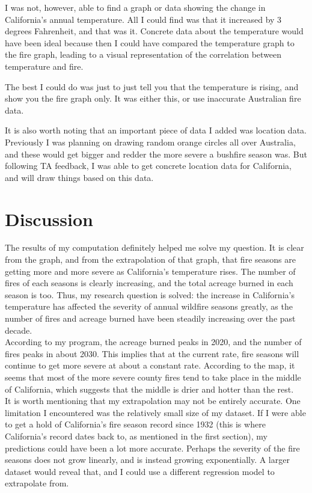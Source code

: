 \documentclass[fontsize=11pt]{article}
\begin{document}
I was not, however, able to find a graph or data showing the change in California's annual temperature. All I could find was that it increased by 3 degrees Fahrenheit, and that was it. Concrete data about the temperature would have been ideal because then I could have compared the temperature graph to the fire graph, leading to a visual representation of the correlation between temperature and fire.

The best I could do was just to just tell you that the temperature is rising, and show you the fire graph only. It was either this, or use inaccurate Australian fire data.

It is also worth noting that an important piece of data I added was location data. Previously I was planning on drawing random orange circles all over Australia, and these would get bigger and redder the more severe a bushfire season was. But following TA feedback, I was able to get concrete location data for California, and will draw things based on this data.

\section*{Discussion}

The results of my computation definitely helped me solve my question. It is clear from the graph, and from the extrapolation of that graph, that fire seasons are getting more and more severe as California's temperature rises. The number of fires of each seasons is clearly increasing, and the total acreage burned in each season is too. Thus, my research question is solved: the increase in California's temperature has affected the severity of annual wildfire seasons greatly, as the number of fires and acreage burned have been steadily increasing over the past decade.\\

According to my program, the acreage burned peaks in 2020, and the number of fires peaks in about 2030. This implies that at the current rate, fire seasons will continue to get more severe at about a constant rate. According to the map, it seems that most of the more severe county fires tend to take place in the middle of California, which suggests that the middle is drier and hotter than the rest.\\

It is worth mentioning that my extrapolation may not be entirely accurate. One limitation I encountered was the relatively small size of my dataset. If I were able to get a hold of California's fire season record since 1932 (this is where California's record dates back to, as mentioned in the first section), my predictions could have been a lot more accurate. Perhaps the severity of the fire seasons does not grow linearly, and is instead growing exponentially. A larger dataset would reveal that, and I could use a different regression model to extrapolate from.
\end{document}
